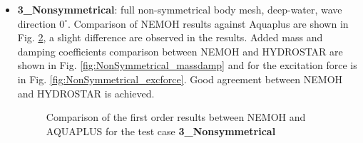 \documentclass[12pt,a4paper,titlepage]{article}
\begin{document}
\begin{itemize}
\begin{figure}[h!t]
\caption{Comparison of the first order results between NEMOH and AQUAPLUS for the test case \textbf{2\_2Bodies}}\label{fig:2Bodies}
\end{figure}
\item \textbf{3\_Nonsymmetrical}: full non-symmetrical body mesh, deep-water, wave direction $0^{\circ}$. Comparison of NEMOH results against Aquaplus are shown in Fig. \ref{fig:NonSymmetrical}, a slight difference are observed in the results.  Added mass and damping coefficients comparison between NEMOH and HYDROSTAR are shown in Fig. \ref{fig:NonSymmetrical_massdamp} and for the excitation force is in Fig. \ref{fig:NonSymmetrical_excforce}. Good agreement between NEMOH and HYDROSTAR is achieved.
\begin{figure}[h!t]
\centering
{}
\caption{Comparison of the first order results between NEMOH and AQUAPLUS for the test case \textbf{3\_Nonsymmetrical}}\label{fig:NonSymmetrical}
\end{figure}


\end{itemize}
\end{document}
